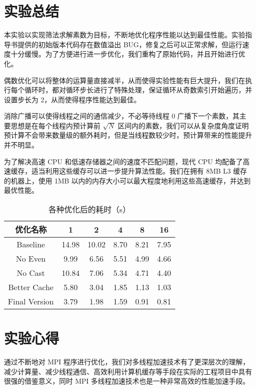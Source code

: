 \documentclass[11pt]{article}
\begin{document}
  \pagebreak
  \section{实验总结}
  本实验以实现筛法求解素数为目标，不断地优化程序性能以达到最佳性能。实验指导书提供的初始版本代码存在数值溢出 BUG，修复之后可以正常求解，但运行速度十分缓慢。为了方便进行进一步优化，我们重构了原始代码，并且开始进行优化。

  偶数优化可以将整体的运算量直接减半，从而使得实验性能有巨大提升，我们在执行每个循环时，都对循环步长进行了特殊处理，保证循环从奇数索引开始遍历，并设置步长为 2，从而使得程序性能达到最佳。

  消除广播可以使得线程之间的通信减少，不必等待线程 0 广播下一个素数，其主要思想是在每个线程内预计算前 $\sqrt{N}$ 区间内的素数，我们可以从复杂度角度证明预计算不会带来数量级的额外耗时，但是当线程数较少时，预计算带来的性能提升并不明显。

  为了解决高速 CPU 和低速存储器之间的速度不匹配问题，现代 CPU 均配备了高速缓存，适当利用这些缓存可以进一步提升算法性能。我们在拥有 8MB L3 缓存的机器上，使用 1MB 以内的内存大小可以最大程度地利用这些高速缓存，并达到最优性能。

  \begin{table}[h]
    \centering
    \caption{各种优化后的耗时（s）}
    \label{tab:cache}
    \begin{tabular}[b]{cccccc}
      \hline
      优化名称 & 1 & 2 & 4 & 8 & 16 \\
      \hline
      Baseline & 14.98 & 10.02 & 8.70 & 8.21 & 7.95\\
      No Even & 9.99 & 6.56 & 5.51 & 4.99 & 4.66\\
      No Cast & 10.84 & 7.06 & 5.34 & 4.71 & 4.40\\
      Better Cache & 5.80 & 3.04 & 1.85 & 1.13 & 1.03\\
      Final Version & 3.79 & 1.98 & 1.59 & 0.91 & 0.81\\
      \hline
    \end{tabular}
  \end{table}

  \section{实验心得}
  通过不断地对 MPI 程序进行优化，我们对多线程加速技术有了更深层次的理解，减少计算量、减少线程通信、高效利用计算机缓存等手段在实际的工程项目中具有很强的借鉴意义，同时 MPI 多线程加速技术也是一种非常高效的性能加速手段。
\end{document}
